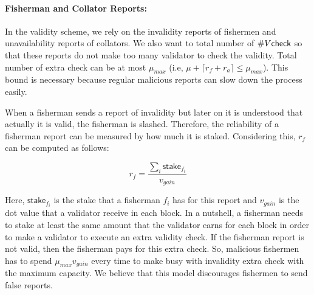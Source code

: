 \paragraph{Fisherman and Collator Reports:} In the validity scheme, we rely on the invalidity reports of fishermen and  unavailability reports of collators. We also want to total number of $\#V\mathsf{check}$ so that these reports do not make too many validator to check the validity. Total number of extra check can be at most $\mu_{max}$ (i.e, $\mu + \lceil r_f + r_a \rceil \leq \mu_{max}$). This bound is necessary because regular malicious reports can slow down the process easily. 

When a fisherman sends a report of invalidity but later on it is understood that actually it is valid, the fisherman is slashed. Therefore, the reliability of a fisherman report can be measured by how much it is staked. 
Considering this, $r_f$ can be computed as follows:

$$r_f = \frac{\sum_{i}\mathsf{stake}_{f_i}}{v_{gain}}$$

Here, $\mathsf{stake}_{f_i}$ is the stake that a fisherman $f_i$ has for this report and $v_{gain}$ is the dot value that a validator receive in each block. In a nutshell, a fisherman needs to stake at least the same amount that the validator earns for each block in order to make a validator to execute an extra validity check. If the fisherman report is not valid, then the fisherman pays for this extra check. So, malicious fishermen has to spend $\mu_{max} v_{gain}$ every time to make busy with invalidity extra check with the maximum capacity. We believe that this model discourages fishermen to send false reports. 

